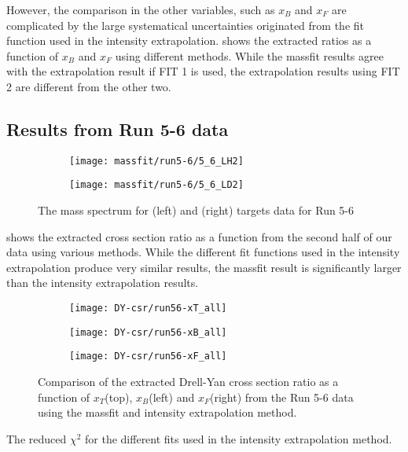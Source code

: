 \documentclass[../main.tex]{subfiles}
\begin{document}
However, the comparison in the other variables, such as $x_B$ and $x_F$ are complicated by the large
systematical uncertainties originated from the fit function used in the intensity extrapolation.
 shows the extracted ratios as a function of $x_B$ and $x_F$ using different methods.
While the massfit results agree with the extrapolation result if FIT 1 is used, the 
extrapolation results using FIT 2 are different from the other two.

\FloatBarrier

\subsection{Results from Run 5-6 data}
\begin{figure}
	\begin{subfigure}{0.45\linewidth}
		\texttt{[image: massfit/run5-6/5\_6\_LH2]}
	\end{subfigure}
	\begin{subfigure}{0.45\linewidth}
		\texttt{[image: massfit/run5-6/5\_6\_LD2]}
	\end{subfigure}	
	\caption{The mass spectrum for (left) and (right) targets data for Run 5-6}
	\label{fig:massfit_integrated_run56}
\end{figure}




 shows the extracted cross section ratio as a function from the
second half of our data using various methods. While the different fit functions used in the 
intensity extrapolation produce very similar results, the massfit result is significantly larger
than the intensity extrapolation results.
\begin{figure}[h!]
	\centering
	\begin{subfigure}{0.6\linewidth}
		\texttt{[image: DY-csr/run56-xT\_all]}
	\end{subfigure}
	\begin{subfigure}{0.45\linewidth}
		\texttt{[image: DY-csr/run56-xB\_all]}
	\end{subfigure}
	\begin{subfigure}{0.45\linewidth}
		\texttt{[image: DY-csr/run56-xF\_all]}
	\end{subfigure}
	\caption{Comparison of the extracted Drell-Yan cross section ratio as a function of $x_T$(top),  $x_B$(left) 
		and $x_F$(right) from the Run 5-6 data using the massfit and intensity extrapolation method.}
	\label{fig:CSR_Run5-6}
\end{figure}
\begin{table}
	\centering
	\caption{The reduced $\chi^2$ for the different fits used in the intensity extrapolation method. }
	
\end{table}
\end{document}
